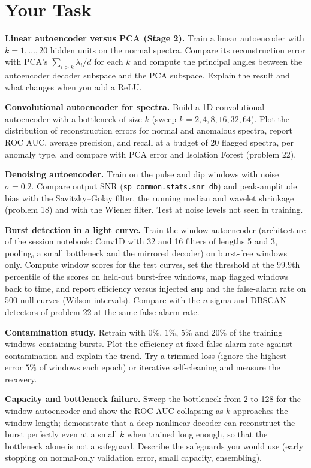 \documentclass[11pt,a4paper]{article}
\begin{document}
\section*{Your Task}
\begin{tasks}
  \item \textbf{Linear autoencoder versus PCA (Stage 2).} Train a linear autoencoder with $k=1,\dots,20$ hidden units on the normal spectra. Compare its reconstruction error with PCA's $\sum_{i>k}\lambda_i/d$ for each $k$ and compute the principal angles between the autoencoder decoder subspace and the PCA subspace. Explain the result and what changes when you add a ReLU.
  \item \textbf{Convolutional autoencoder for spectra.} Build a 1D convolutional autoencoder with a bottleneck of size $k$ (sweep $k=2,4,8,16,32,64$). Plot the distribution of reconstruction errors for normal and anomalous spectra, report ROC AUC, average precision, and recall at a budget of 20 flagged spectra, per anomaly type, and compare with PCA error and Isolation Forest (problem 22).
  \item \textbf{Denoising autoencoder.} Train on the pulse and dip windows with noise $\sigma=0.2$. Compare output SNR (\texttt{sp\_common.stats.snr\_db}) and peak-amplitude bias with the Savitzky--Golay filter, the running median and wavelet shrinkage (problem 18) and with the Wiener filter. Test at noise levels not seen in training.
  \item \textbf{Burst detection in a light curve.} Train the window autoencoder (architecture of the session notebook: Conv1D with 32 and 16 filters of lengths 5 and 3, pooling, a small bottleneck and the mirrored decoder) on burst-free windows only. Compute window scores for the test curves, set the threshold at the $99.9$th percentile of the scores on held-out burst-free windows, map flagged windows back to time, and report efficiency versus injected \texttt{amp} and the false-alarm rate on 500 null curves (Wilson intervals). Compare with the $n$-sigma and DBSCAN detectors of problem 22 at the same false-alarm rate.
  \item \textbf{Contamination study.} Retrain with $0\%$, $1\%$, $5\%$ and $20\%$ of the training windows containing bursts. Plot the efficiency at fixed false-alarm rate against contamination and explain the trend. Try a trimmed loss (ignore the highest-error $5\%$ of windows each epoch) or iterative self-cleaning and measure the recovery.
  \item \textbf{Capacity and bottleneck failure.} Sweep the bottleneck from 2 to 128 for the window autoencoder and show the ROC AUC collapsing as $k$ approaches the window length; demonstrate that a deep nonlinear decoder can reconstruct the burst perfectly even at a small $k$ when trained long enough, so that the bottleneck alone is not a safeguard. Describe the safeguards you would use (early stopping on normal-only validation error, small capacity, ensembling).

\end{tasks}
\end{document}
